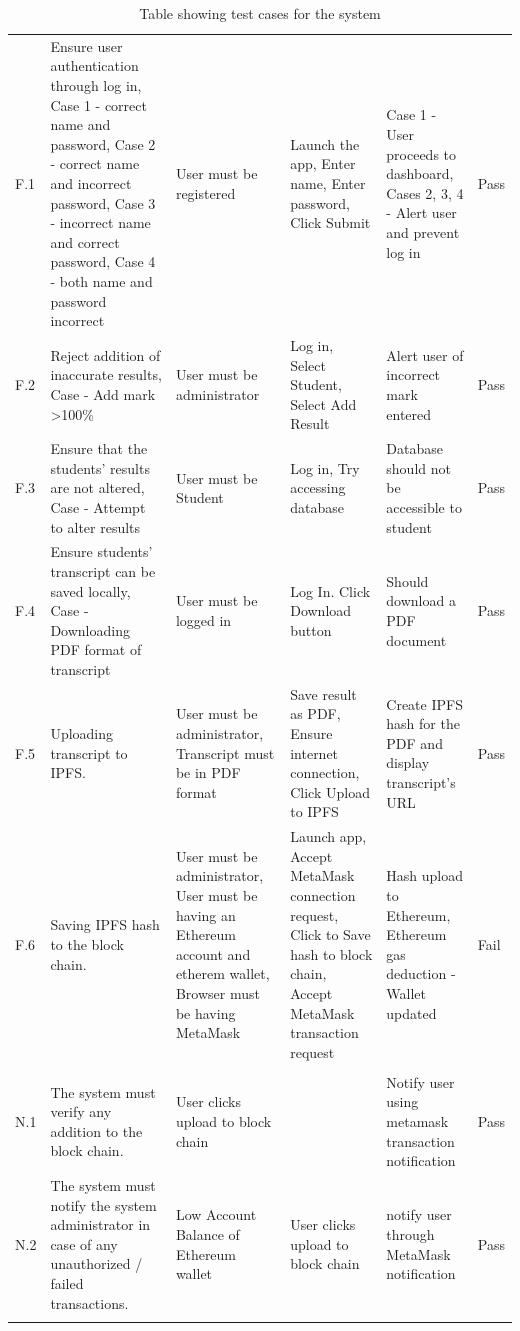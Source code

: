 \begin{longtable}{|p{0.5cm}|p{4cm}|p{2cm}|p{2cm}|p{3cm}|p{0.6cm}|}
\rowcolor[HTML]{9AFF99} 
\multicolumn{6}{|l|}{\cellcolor[HTML]{9AFF99}FUNCTIONAL REQUIREMENTS} \\ \hline
F.1 & Ensure user authentication through log in, Case 1 - correct name and password, Case 2 - correct name and incorrect password, Case 3 - incorrect name and correct password, Case 4 - both name and password incorrect & User must be registered & Launch the app, Enter name, Enter password, Click Submit & Case 1 - User proceeds to dashboard, Cases 2, 3, 4 - Alert user and prevent log in & Pass \\ \hline
F.2 & Reject addition of inaccurate results, Case - Add mark \textgreater 100\% & User must be administrator & Log in, Select Student, Select Add Result & Alert user of incorrect mark entered & Pass \\ \hline
F.3 & Ensure that the students’ results are not altered, Case - Attempt to alter results & User must be Student & Log in, Try accessing database & Database should not be accessible to student & Pass \\ \hline
F.4 & Ensure students' transcript can be saved locally, Case - Downloading PDF format of transcript & User must  be logged in & Log In. Click Download button & Should download a PDF document & Pass \\ \hline
F.5 & Uploading transcript to IPFS. & User must be administrator, Transcript must be in PDF format & Save result as PDF, Ensure internet connection, Click Upload to IPFS & Create IPFS hash for the PDF and display transcript's URL & Pass \\ \hline
F.6 & Saving IPFS hash to the block chain. & User must be administrator, User must be having an Ethereum account and etherem wallet, Browser must be having MetaMask & Launch app, Accept MetaMask connection request, Click to Save hash to block chain, Accept MetaMask transaction request & Hash upload to Ethereum, Ethereum gas deduction - Wallet updated & Fail \\ \hline
\rowcolor[HTML]{9AFF99} 
\multicolumn{6}{|l|}{\cellcolor[HTML]{9AFF99}NON FUNCTIONAL REQUIREMENTS} \\ \hline
N.1 & The system must verify any addition to the block chain. & User clicks upload to block chain &  & Notify user using metamask transaction notification & Pass \\ \hline
N.2 & The system must notify the system administrator in case of any unauthorized / failed transactions. & Low Account Balance of Ethereum wallet & User clicks upload to block chain & notify user through MetaMask notification & Pass \\ \hline
\caption{Table showing test cases for the system}
\label{Table 1}\\
\end{longtable}

